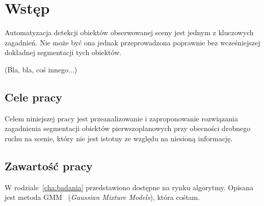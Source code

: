 \chapter{Wstęp}
\label{cha:wstęp}

Automatyzacja detekcji obiektów obserwowanej sceny jest jednym z kluczowych zagadnień. Nie może być ona jednak przeprowadzona poprawnie bez wcześniejszej dokładnej segmentacji tych obiektów.

(Bla, bla, coś innego...)


\section{Cele pracy}
\label{sec:celePracy}

Celem niniejszej pracy jest przeanalizowanie i zaproponowanie rozwiązania zagadnienia segmentacji obiektów pierwszoplanowych przy obecności drobnego ruchu na scenie, który nie jest istotny ze względu na niesioną informację.



\section{Zawartość pracy}
\label{sec:zawartoscPracy}

W rodziale~\ref{cha:badania} przedstawiono dostępne na rynku algorytmy. Opisana jest metoda GMM~\cite{Rey09} ({\em Gaussian Mixture Models}), która cośtam.


















